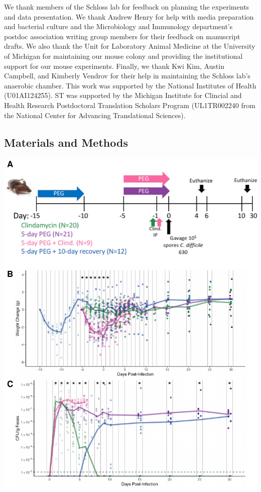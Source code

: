 \documentclass[
  11pt,
]{article}
\begin{document}
We thank members of the Schloss lab for feedback on planning the
experiments and data presentation. We thank Andrew Henry for help with
media preparation and bacterial culture and the Microbiology and
Immunology department's postdoc association writing group members for
their feedback on manuscript drafts. We also thank the Unit for
Laboratory Animal Medicine at the University of Michigan for maintaining
our mouse colony and providing the institutional support for our mouse
experiments. Finally, we thank Kwi Kim, Austin Campbell, and Kimberly
Vendrov for their help in maintaining the Schloss lab's anaerobic
chamber. This work was supported by the National Institutes of Health
(U01AI124255). ST was supported by the Michigan Institute for Clincial
and Health Research Postdoctoral Translation Scholars Program
(UL1TR002240 from the National Center for Advancing Translational
Sciences).

\hypertarget{materials-and-methods}{%
\subsection{Materials and Methods}\label{materials-and-methods}}

\newpage

\includegraphics{figure_1.pdf}
\end{document}
